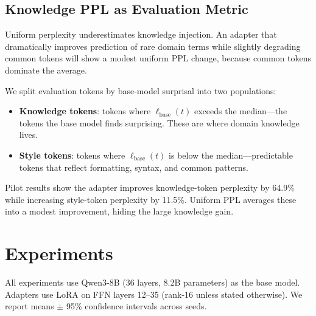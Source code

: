 \documentclass{article}
\begin{document}

\subsection{Knowledge PPL as Evaluation Metric}
\label{sec:knowledge-ppl}

Uniform perplexity underestimates knowledge injection. An adapter that
dramatically improves prediction of rare domain terms while slightly
degrading common tokens will show a modest uniform PPL change, because
common tokens dominate the average.

We split evaluation tokens by base-model surprisal into two populations:
\begin{itemize}[nosep,leftmargin=1.5em]
\item \textbf{Knowledge tokens}: tokens where $\ell_{\text{base}}(t)$
      exceeds the median---the tokens the base model finds surprising.
      These are where domain knowledge lives.
\item \textbf{Style tokens}: tokens where $\ell_{\text{base}}(t)$ is
      below the median---predictable tokens that reflect formatting,
      syntax, and common patterns.
\end{itemize}


Pilot results show the adapter improves knowledge-token perplexity by
64.9\% while increasing style-token perplexity by 11.5\%. Uniform PPL
averages these into a modest improvement, hiding the large knowledge
gain.

\section{Experiments}
\label{sec:experiments}

All experiments use Qwen3-8B (36 layers, 8.2B parameters) as the base
model. Adapters use LoRA on FFN layers 12--35 (rank-16 unless stated
otherwise). We report means $\pm$ 95\% confidence intervals across seeds.

\end{document}
